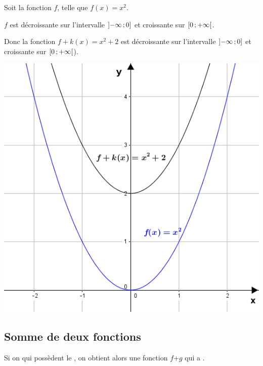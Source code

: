 \documentclass[12pt,a4paper]{article}
\begin{document}
\begin{myex}
	\begin{multicols}{2}
		\vspace*{1cm}
		
		Soit la fonction $f$, telle que $f(x) = x^2$.
		
		$f$ est décroissante sur l'intervalle $\mbox{\ensuremath{\left]-\infty\mathpunct{};0\right]}} $ et croissante sur $\mbox{\ensuremath{\left[0\mathpunct{};+\infty\right[}}$.
		
		Donc la fonction $f+k(x) = x^2 + 2 $ est décroissante sur l'intervalle $\mbox{\ensuremath{\left]-\infty\mathpunct{};0\right]}} $ et croissante sur $\mbox{\ensuremath{\left[0\mathpunct{};+\infty\right[}}$).
			
		\includegraphics[scale=0.6]{./img/k+f}
	\end{multicols}
\end{myex}

\subsection{Somme de deux fonctions}

\begin{myprop}
	Si on  qui possèdent le , on obtient alors une fonction $f$+$g$ qui a . 
\end{myprop}
\end{document}
